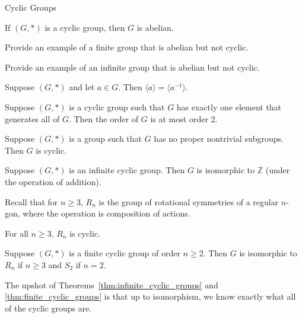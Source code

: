 \begin{section}{Cyclic Groups}
\begin{theorem}
If $(G,*)$ is a cyclic group, then $G$ is abelian.
\end{theorem}

\begin{exercise}
Provide an example of a finite group that is abelian but not cyclic.
\end{exercise}

\begin{exercise}
Provide an example of an infinite group that is abelian but not cyclic.
\end{exercise}

\begin{theorem}%
Suppose $(G,*)$ and let $a\in G$. Then $\langle a\rangle=\langle a^{-1}\rangle$.
\end{theorem}

\begin{theorem}
Suppose $(G,*)$ is a cyclic group such that $G$ has exactly one element that generates all of $G$.  Then the order of $G$ is at most order 2.   
\end{theorem}

\begin{theorem}
Suppose $(G,*)$ is a group such that $G$ has no proper nontrivial subgroups.  Then $G$ is cyclic.
\end{theorem}

\begin{theorem}\label{thm:infinite_cyclic_groups}
Suppose $(G,*)$ is an infinite cyclic group.  Then $G$ is isomorphic to $\mathbb{Z}$ (under the operation of addition).
\end{theorem}

Recall that for $n\geq3$, $R_n$ is the group of rotational symmetries of a regular $n$-gon, where the operation is composition of actions.

\begin{theorem}
For all $n\geq 3$, $R_n$ is cyclic.
\end{theorem}

\begin{theorem}\label{thm:finite_cyclic_groups}
Suppose $(G,*)$ is a finite cyclic group of order $n\geq 2$.  Then $G$ is isomorphic to $R_n$ if $n\geq 3$ and $S_2$ if $n=2$.
\end{theorem}

The upshot of Theorems~\ref{thm:infinite_cyclic_groups} and \ref{thm:finite_cyclic_groups} is that up to isomorphism, we know exactly what all of the cyclic groups are.


\end{section}
